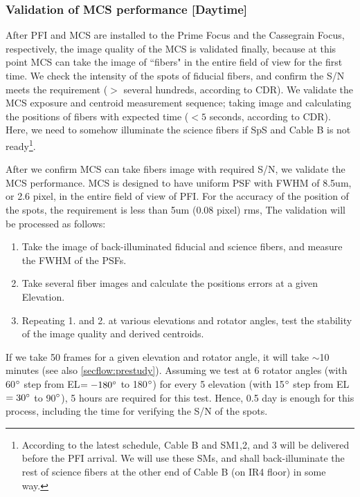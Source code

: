 \subsubsection{Validation of MCS performance [Daytime]}\label{secflow:MCSperf}


After PFI and MCS are installed to the Prime Focus and the Cassegrain  Focus, respectively, the image quality of the MCS is validated finally, because at this point MCS can take the image of ``fibers" in the entire field of view for the first time.
We check the intensity of the spots of fiducial fibers, and confirm the S/N meets the requirement ($>$ several hundreds, according to CDR).
We validate the MCS exposure and centroid measurement sequence; taking image and calculating the positions of fibers with expected time ($<5$ seconds, according to CDR).
Here, we need to somehow illuminate the science fibers if SpS and Cable B is not ready\footnote{According to the latest schedule, Cable B and SM1,2, and 3 will be delivered before the PFI arrival. We will use these SMs, and shall back-illuminate the rest of science fibers at the other end of Cable B (on IR4 floor) in some way.}.

After we confirm MCS can take fibers image with required S/N, we validate the MCS performance.
MCS is designed to have uniform PSF with FWHM of 8.5um, or 2.6 pixel, in the entire field of view of PFI.
For the accuracy of the position of the spots, the requirement is less than 5um (0.08 pixel) rms, 
The validation will be processed as follows:
\begin{enumerate}
\item Take the image of back-illuminated fiducial and science fibers, and measure the FWHM of the PSFs.
\item Take several fiber images and calculate the positions errors at a given Elevation. 
\item Repeating 1. and 2. at various elevations and rotator angles, test the stability of the image quality and derived centroids.
\end{enumerate}

If we take 50 frames for a given elevation and rotator angle, it will take $\sim$10 minutes (see also \ref{secflow:prestudy}).
Assuming we test at 6 rotator angles (with 60$^\circ$ step from EL$=-180^\circ$ to 180$^\circ$) for every 5 elevation (with 15$^\circ$ step from EL$=30^\circ$ to 90$^\circ$), 5 hours are required for this test.
Hence, 0.5 day is enough for this process, including the time for verifying the S/N of the spots.


